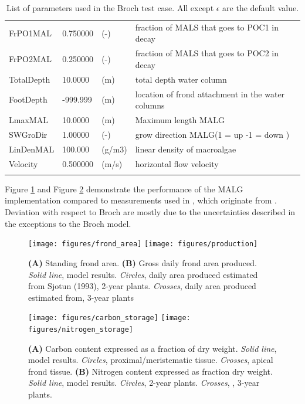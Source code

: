 \documentclass{deltares_manual}
\begin{document}
\begin{longtable}{|l|l|l|l|}
	FrPO1MAL & 0.750000 & (-) & fraction of MALS that goes to POC1 in decay\\ 
	FrPO2MAL & 0.250000 & (-) & fraction of MALS that goes to POC2 in decay\\ 
	TotalDepth & 10.0000 & (m) & total depth water column\\ 
	FootDepth & -999.999 & (m) & location of frond attachment in the water columns\\ 
	LmaxMAL & 10.0000 & (m) & Maximum length MALG\\ 
	SWGroDir & 1.00000 & (-) & grow direction MALG(1 = up -1 = down )\\ 
	LinDenMAL & 100.000 & (g/m3) & linear density of macroalgae\\ 
	Velocity & 0.500000 & (m/s) & horizontal flow velocity\\ 
	\hline
	\caption{List of parameters used in the Broch test case. All except $\epsilon$ are the default value.}
	\label{tab:parameters}
\end{longtable}

Figure \ref{fig:biomass} and Figure \ref{fig:storage} demonstrate the performance of the MALG implementation compared to measurements used in \cite{broch2012}, which originate from \cite{sjotun1993}. Deviation with respect to Broch are mostly due to the uncertainties described in the exceptions to the Broch model.

\begin{figure}[H]
	\centering
	\texttt{[image: figures/frond\_area]}
	\texttt{[image: figures/production]}
	\caption{\textbf{(A)} Standing frond area. \textbf{(B)} Gross daily frond area produced. \textit{Solid line}, model results. \textit{Circles}, daily area produced estimated from Sjotun (1993), 2-year plants. \textit{Crosses}, daily area produced estimated from\cite{sjotun1993}, 3-year plants}
	\label{fig:biomass}
\end{figure}

\begin{figure}[H]
	\centering
	\texttt{[image: figures/carbon\_storage]}
	\texttt{[image: figures/nitrogen\_storage]}
	\caption{\textbf{(A)} Carbon content expressed as a fraction of dry weight. \textit{Solid line}, model results. \textit{Circles}, \cite{sjotun1993} proximal/meristematic tissue. \textit{Crosses}, apical frond tissue. \textbf{(B)} Nitrogen content expressed as fraction dry weight. \textit{Solid line}, model results. \textit{Circles}, \cite{sjotun1993} 2-year plants. \textit{Crosses}, \cite{sjotun1993}, 3-year plants.}
	\label{fig:storage}
\end{figure}
\end{document}
